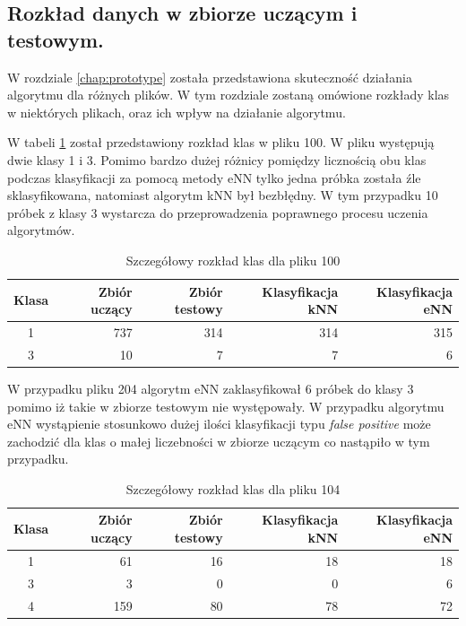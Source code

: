 \subsection{Rozkład danych w zbiorze uczącym i testowym.}
W rozdziale \ref{chap:prototype} została przedstawiona skuteczność działania algorytmu dla różnych plików. W tym rozdziale zostaną omówione rozkłady klas w niektórych plikach, oraz ich wpływ na działanie algorytmu.


W tabeli \ref{tab:matlab-plik100} został przedstawiony rozkład klas w pliku 100. W pliku występują dwie klasy 1 i 3. Pomimo bardzo dużej różnicy pomiędzy licznością obu klas podczas klasyfikacji za pomocą metody eNN tylko jedna próbka została źle sklasyfikowana, natomiast algorytm kNN był bezbłędny. W tym przypadku 10 próbek z klasy 3 wystarcza do przeprowadzenia poprawnego procesu uczenia algorytmów.

\begin{table}[H]
	\centering
	\begin{tabular}{|c|r|r|r|r|}
		\hline
		
		Klasa & Zbiór uczący & Zbiór testowy & Klasyfikacja kNN & Klasyfikacja eNN \\
		\hline
		1 & 737 & 314 & 314 & 315 \\
		\hline 
		3 & 10 & 7 & 7 & 6 \\
		\hline
                          
	\end{tabular}
	\caption{Szczegółowy rozkład klas dla pliku 100}
	\label{tab:matlab-plik100}
\end{table}

W przypadku pliku 204 algorytm eNN zaklasyfikował 6 próbek do klasy 3 pomimo iż takie w zbiorze testowym nie występowały. W przypadku algorytmu eNN wystąpienie stosunkowo dużej ilości klasyfikacji typu \textit{false positive} może zachodzić dla klas o małej liczebności w zbiorze uczącym co nastąpiło w tym przypadku.

\begin{table}[H]
	\centering
	\begin{tabular}{|c|r|r|r|r|}
		\hline
		
		Klasa & Zbiór uczący & Zbiór testowy & Klasyfikacja kNN & Klasyfikacja eNN \\
		\hline
		1 & 61 & 16 & 18 & 18 \\
		\hline 
		3 & 3 & 0 & 0 & 6 \\
		\hline
		4 & 159 & 80 & 78 & 72 \\
		\hline
		
	\end{tabular}
	\caption{Szczegółowy rozkład klas dla pliku 104}
	\label{tab:matlab-plik104}
\end{table}


